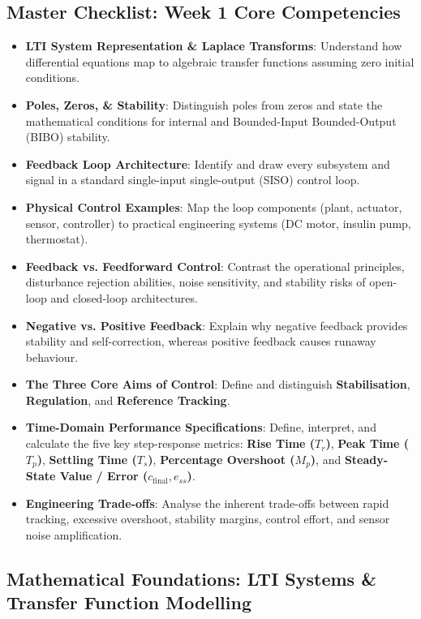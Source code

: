 \documentclass[12pt,onecolumn,twoside ]{article}
\begin{document}
	\subsection{Master Checklist: Week 1 Core Competencies}
	\begin{itemize}
		\item[$\square$]
		\textbf{LTI System Representation \& Laplace Transforms}: Understand how differential equations map to algebraic transfer functions assuming zero initial conditions.
		\item[$\square$]
		\textbf{Poles, Zeros, \& Stability}: Distinguish poles from zeros and state the mathematical conditions for internal and Bounded-Input Bounded-Output (BIBO) stability.
		\item[$\square$]
		\textbf{Feedback Loop Architecture}: Identify and draw every subsystem and signal in a standard single-input single-output (SISO) control loop.
		\item[$\square$]
		\textbf{Physical Control Examples}: Map the loop components (plant, actuator, sensor, controller) to practical engineering systems (DC motor, insulin pump, thermostat).
		\item[$\square$]
		\textbf{Feedback vs. Feedforward Control}: Contrast the operational principles, disturbance rejection abilities, noise sensitivity, and stability risks of open-loop and closed-loop architectures.
		\item[$\square$]
		\textbf{Negative vs. Positive Feedback}: Explain why negative feedback provides stability and self-correction, whereas positive feedback causes runaway behaviour.
		\item[$\square$]
		\textbf{The Three Core Aims of Control}: Define and distinguish \textbf{Stabilisation}, \textbf{Regulation}, and \textbf{Reference Tracking}.
		\item[$\square$]
		\textbf{Time-Domain Performance Specifications}: Define, interpret, and calculate the five key step-response metrics: \textbf{Rise Time ($T_r$)}, \textbf{Peak Time ($T_p$)}, \textbf{Settling Time ($T_s$)}, \textbf{Percentage Overshoot ($M_p$)}, and \textbf{Steady-State Value / Error ($c_{\text{final}}, e_{ss}$)}.
		\item[$\square$]
		\textbf{Engineering Trade-offs}: Analyse the inherent trade-offs between rapid tracking, excessive overshoot, stability margins, control effort, and sensor noise amplification.
	\end{itemize}
	
	\subsection{Mathematical Foundations: LTI Systems \& Transfer Function Modelling}
\end{document}
